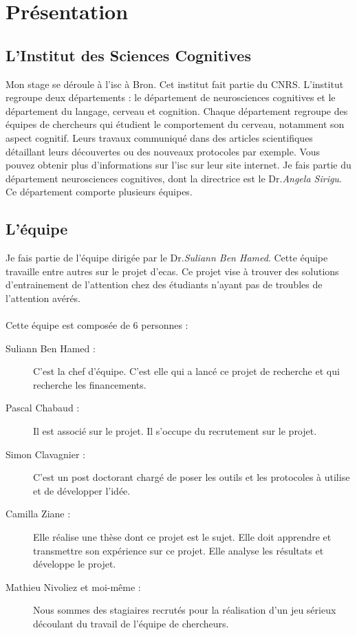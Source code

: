 \section{Présentation}

\subsection{L'Institut des Sciences Cognitives}

Mon stage se déroule à l'\gls{isc} à Bron. Cet institut fait partie du \gls{CNRS}. L'institut regroupe deux départements : le département de neurosciences cognitives et le département
du langage, cerveau et cognition. Chaque département regroupe des équipes de chercheurs qui étudient le comportement du cerveau, notamment son aspect cognitif. Leurs travaux communiqué
dans des articles scientifiques détaillant leurs découvertes ou des nouveaux protocoles par exemple. Vous pouvez obtenir plus d'informations sur l'\gls{isc} sur leur site
internet\cite{ISC00}. Je fais partie du département neurosciences cognitives, dont la directrice est le Dr.\emph{Angela Sirigu}. Ce département comporte plusieurs équipes.

\subsection{L'équipe}Je fais partie de l'équipe dirigée par le Dr.\emph{Suliann Ben Hamed}. Cette équipe travaille entre autres sur le projet d'\gls{ecas}. Ce projet vise à trouver
des solutions d'entrainement de l'attention chez des étudiants n'ayant pas de troubles de l'attention avérés.

\paragraph{}Cette équipe est composée de 6 personnes :
\begin{description}
    \item[Suliann Ben Hamed :] C'est la chef d'équipe. C'est elle qui a lancé ce projet de recherche et qui recherche les financements.
    \item[Pascal Chabaud :] Il est associé sur le projet. Il s'occupe du recrutement sur le projet.
    \item[Simon Clavagnier :] C'est un post doctorant chargé de poser les outils et les protocoles à utilise et de développer l'idée.
    \item[Camilla Ziane :] Elle réalise une thèse dont ce projet est le sujet. Elle doit apprendre et transmettre son expérience sur ce projet. Elle analyse les résultats et développe
    le projet.
    \item[Mathieu Nivoliez et moi-même :] Nous sommes des stagiaires recrutés pour la réalisation d'un jeu sérieux découlant du travail de l'équipe de chercheurs.\\ \\
\end{description}

